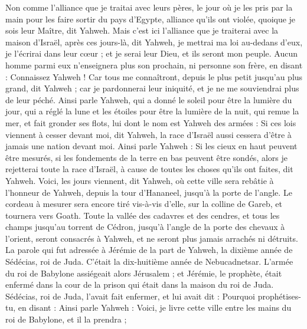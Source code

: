 \begin{multicols}{2}
Non comme l'alliance que je traitai avec leurs pères, le jour où je les pris par la main pour les faire sortir du pays d'Egypte, alliance qu’ils ont violée, quoique je sois leur Maître, dit Yahweh.
Mais c’est ici l'alliance que je traiterai avec la maison d'Israël, après ces jours-là, dit Yahweh, je mettrai ma loi au-dedans d'eux, je l'écrirai dans leur cœur ; et je serai leur Dieu, et ils seront mon peuple.
Aucun homme parmi eux n’enseignera plus son prochain, ni personne son frère, en disant : Connaissez Yahweh ! Car tous me connaîtront, depuis le plus petit jusqu’au plus grand, dit Yahweh ; car je pardonnerai leur iniquité, et je ne me souviendrai plus de leur péché.
Ainsi parle Yahweh, qui a donné le soleil pour être la lumière du jour, qui a réglé la lune et les étoiles pour être la lumière de la nuit, qui remue la mer, et fait gronder ses flots, lui dont le nom est Yahweh des armées :
Si ces lois viennent à cesser devant moi, dit Yahweh, la race d'Israël aussi cessera d'être à jamais une nation devant moi.
Ainsi parle Yahweh : Si les cieux en haut peuvent être mesurés, si les fondements de la terre en bas peuvent être sondés, alors je rejetterai toute la race d'Israël, à cause de toutes les choses qu'ils ont faites, dit Yahweh.
Voici, les jours viennent, dit Yahweh, où cette ville sera rebâtie à l’honneur de Yahweh, depuis la tour d'Hananeel, jusqu'à la porte de l’angle.
Le cordeau à mesurer sera encore tiré vis-à-vis d'elle, sur la colline de Gareb, et tournera vers Goath.
Toute la vallée des cadavres et des cendres, et tous les champs jusqu’au torrent de Cédron, jusqu’à l’angle de la porte des chevaux à l'orient, seront consacrés à Yahweh, et ne seront plus jamais arrachés ni détruits.
\VerseOne{}La parole qui fut adressée à Jérémie de la part de Yahweh, la dixième année de Sédécias, roi de Juda. C’était la dix-huitième année de Nebucadnetsar.
L'armée du roi de Babylone assiégeait alors Jérusalem ; et Jérémie, le prophète, était enfermé dans la cour de la prison qui était dans la maison du roi de Juda.
Sédécias, roi de Juda, l'avait fait enfermer, et lui avait dit : Pourquoi prophétises-tu, en disant : Ainsi parle Yahweh : Voici, je livre cette ville entre les mains du roi de Babylone, et il la prendra ;

\end{multicols}

